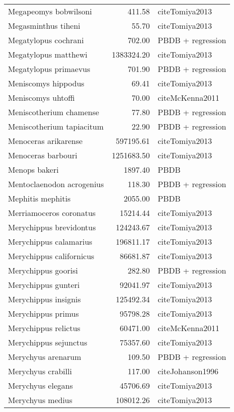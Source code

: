 \begin{table}[ht]
\begin{tabular}{lrl}
  Megapeomys bobwilsoni & 411.58 & cite{Tomiya2013} \\ 
  Megasminthus tiheni & 55.70 & cite{Tomiya2013} \\ 
  Megatylopus cochrani & 702.00 & PBDB + regression \\ 
  Megatylopus matthewi & 1383324.20 & cite{Tomiya2013} \\ 
  Megatylopus primaevus & 701.90 & PBDB + regression \\ 
  Meniscomys hippodus & 69.41 & cite{Tomiya2013} \\ 
  Meniscomys uhtoffi & 70.00 & cite{McKenna2011} \\ 
  Meniscotherium chamense & 77.80 & PBDB + regression \\ 
  Meniscotherium tapiacitum & 22.90 & PBDB + regression \\ 
  Menoceras arikarense & 597195.61 & cite{Tomiya2013} \\ 
  Menoceras barbouri & 1251683.50 & cite{Tomiya2013} \\ 
  Menops bakeri & 1897.40 & PBDB \\ 
  Mentoclaenodon acrogenius & 118.30 & PBDB + regression \\ 
  Mephitis mephitis & 2055.00 & PBDB \\ 
  Merriamoceros coronatus & 15214.44 & cite{Tomiya2013} \\ 
  Merychippus brevidontus & 124243.67 & cite{Tomiya2013} \\ 
  Merychippus calamarius & 196811.17 & cite{Tomiya2013} \\ 
  Merychippus californicus & 86681.87 & cite{Tomiya2013} \\ 
  Merychippus goorisi & 282.80 & PBDB + regression \\ 
  Merychippus gunteri & 92041.97 & cite{Tomiya2013} \\ 
  Merychippus insignis & 125492.34 & cite{Tomiya2013} \\ 
  Merychippus primus & 95798.28 & cite{Tomiya2013} \\ 
  Merychippus relictus & 60471.00 & cite{McKenna2011} \\ 
  Merychippus sejunctus & 75357.60 & cite{Tomiya2013} \\ 
  Merychyus arenarum & 109.50 & PBDB + regression \\ 
  Merychyus crabilli & 117.00 & cite{Johanson1996} \\ 
  Merychyus elegans & 45706.69 & cite{Tomiya2013} \\ 
  Merychyus medius & 108012.26 & cite{Tomiya2013} \\ 

\end{tabular}
\end{table}
